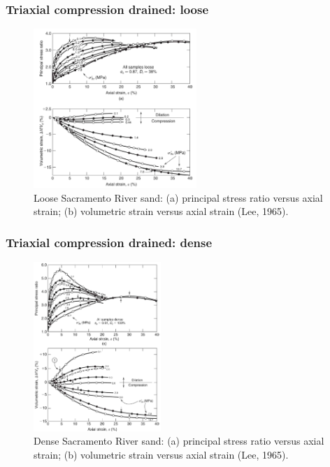\documentclass[notes]{beamer}
\begin{document}
\begin{frame}
\frametitle{Triaxial compression drained: loose}
\begin{figure}
	\includegraphics[width=0.55\textwidth]{figs/tx-drained-loose.png}
	\caption*{Loose Sacramento River sand: (a) principal stress ratio versus
		axial strain; (b) volumetric strain versus axial strain (Lee, 1965).}
\end{figure}
\end{frame}

\begin{frame}
\frametitle{Triaxial compression drained: dense}
\begin{figure}
	\includegraphics[width=0.43\textwidth]{figs/tx-drained-dense.png}
	\caption*{Dense Sacramento River sand: (a) principal stress ratio versus
		axial strain; (b) volumetric strain versus axial strain (Lee, 1965).}
\end{figure}
\end{frame}
\end{document}
